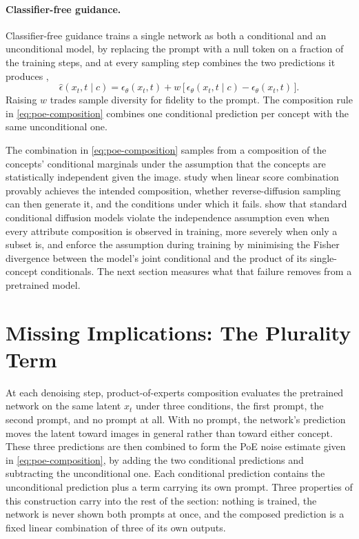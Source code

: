 \documentclass{article} %
\begin{document}
\paragraph{Classifier-free guidance.} Classifier-free guidance trains a single network as both a conditional and an unconditional model, by replacing the prompt with a null token on a fraction of the training steps, and at every sampling step combines the two predictions it produces \citep{ho2022classifier},
\begin{equation}
\hat\epsilon(x_t, t \mid c) = \epsilon_\theta(x_t, t) + w\,\big[\,\epsilon_\theta(x_t, t \mid c) - \epsilon_\theta(x_t, t)\,\big].
\label{eq:cfg}
\end{equation}
Raising $w$ trades sample diversity for fidelity to the prompt. The composition rule in \eqref{eq:poe-composition} combines one conditional prediction per concept with the same unconditional one.

The combination in \eqref{eq:poe-composition} samples from a composition of the concepts' conditional marginals under the assumption that the concepts are statistically independent given the image. \citet{bradley2025mechanisms} study when linear score combination provably achieves the intended composition, whether reverse-diffusion sampling can then generate it, and the conditions under which it fails. \citet{gaudi2025coind} show that standard conditional diffusion models violate the independence assumption even when every attribute composition is observed in training, more severely when only a subset is, and enforce the assumption during training by minimising the Fisher divergence between the model's joint conditional and the product of its single-concept conditionals. The next section measures what that failure removes from a pretrained model.

\section{Missing Implications: The Plurality Term}
\label{sec:interaction}

At each denoising step, product-of-experts composition evaluates the pretrained network on the same latent $x_t$ under three conditions, the first prompt, the second prompt, and no prompt at all. With no prompt, the network's prediction moves the latent toward images in general rather than toward either concept. These three predictions are then combined to form the PoE noise estimate given in \eqref{eq:poe-composition}, by adding the two conditional predictions and subtracting the unconditional one. Each conditional prediction contains the unconditional prediction plus a term carrying its own prompt. Three properties of this construction carry into the rest of the section: nothing is trained, the network is never shown both prompts at once, and the composed prediction is a fixed linear combination of three of its own outputs.
\end{document}
